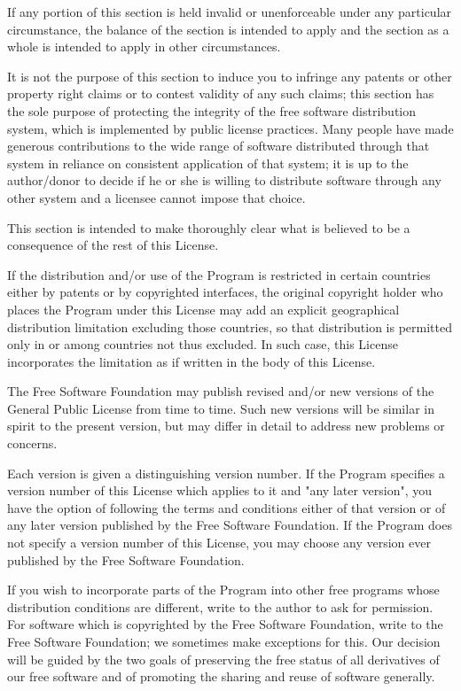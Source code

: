 {\begin{description}
If any portion of this section is held invalid or unenforceable under
any particular circumstance, the balance of the section is intended to
apply and the section as a whole is intended to apply in other
circumstances.

It is not the purpose of this section to induce you to infringe any
patents or other property right claims or to contest validity of any
such claims; this section has the sole purpose of protecting the
integrity of the free software distribution system, which is
implemented by public license practices.  Many people have made
generous contributions to the wide range of software distributed
through that system in reliance on consistent application of that
system; it is up to the author/donor to decide if he or she is willing
to distribute software through any other system and a licensee cannot
impose that choice.

This section is intended to make thoroughly clear what is believed to
be a consequence of the rest of this License.

\item[8.\hphantom{XX}] If the distribution and/or use of the Program is restricted in
certain countries either by patents or by copyrighted interfaces, the
original copyright holder who places the Program under this License
may add an explicit geographical distribution limitation excluding
those countries, so that distribution is permitted only in or among
countries not thus excluded.  In such case, this License incorporates
the limitation as if written in the body of this License.

\item[9.\hphantom{XX}] The Free Software Foundation may publish revised and/or new
versions of the General Public License from time to time.  Such new
versions will be similar in spirit to the present version, but may
differ in detail to address new problems or concerns.

Each version is given a distinguishing version number.  If the Program
specifies a version number of this License which applies to it and "any
later version", you have the option of following the terms and
conditions either of that version or of any later version published by
the Free Software Foundation.  If the Program does not specify a version
number of this License, you may choose any version ever published by the
Free Software Foundation.

\item[10.\hphantom{X}] If you wish to incorporate parts of the Program into other free
programs whose distribution conditions are different, write to the
author to ask for permission.  For software which is copyrighted by the
Free Software Foundation, write to the Free Software Foundation; we
sometimes make exceptions for this.  Our decision will be guided by the
two goals of preserving the free status of all derivatives of our free
software and of promoting the sharing and reuse of software generally.


\end{description}}
